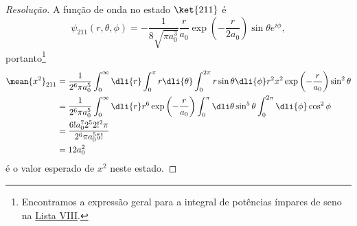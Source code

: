 \begin{proof}[Resolução]
    A função de onda no estado \(\ket{211}\) é
    \begin{equation*}
        \psi_{211}(r, \theta,\phi) = -\frac{1}{8\sqrt{\pi a_0^3}} \frac{r}{a_0}\exp\left(-\frac{r}{2a_0} \right)\sin\theta e^{i\phi},
    \end{equation*}
    portanto\footnote{Encontramos a expressão geral para a integral de potências ímpares de seno na \href{https://github.com/louisradial/4302403-mecanica-quantica-i/releases/tag/lista8}{Lista VIII}.}
    \begin{align*}
        \mean{x^2}_{211} &= \frac{1}{2^6\pi a_0^5} \int_0^\infty \dli{r} \int_0^\pi r \dli{\theta} \int_0^{2\pi} r\sin\theta \dli{\phi} r^2 x^2 \exp\left(-\frac{r}{a_0}\right) \sin^2 \theta\\
                         &= \frac{1}{2^6\pi a_0^5} \int_0^\infty \dli{r} r^6 \exp\left(-\frac{r}{a_0}\right) \int_0^{\pi} \dli\theta \sin^5\theta \int_0^{2\pi}\dli{\phi} \cos^2\phi\\
                         &= \frac{6! a_0^7 2^5 2!^2 \pi}{2^6 \pi a_0^5 5!}\\
                         &= 12a_0^2
    \end{align*}
    é o valor esperado de \(x^2\) neste estado.
\end{proof}
